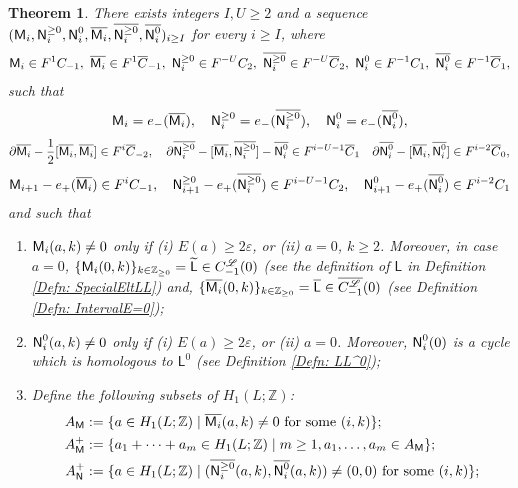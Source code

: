 \documentclass[10pt]{amsart}
\numberwithin{equation}{section}
\theoremstyle{plain}
\newtheorem{theorem}{Theorem}[section]
\theoremstyle{definition}
\theoremstyle{remark}
\numberwithin{equation}{section}
\newcommand{\Z}{\mathbb{Z}}
\newcommand{\wt}[1]{\widetilde{#1}}
\newcommand{\ol}[1]{\overline{#1}}
\newcommand{\Cfr}[1]{C_{#1}^\mathscr{L}}
\newcommand{\MM}{\textup{\textsf{M}}}
\newcommand{\NN}{\textup{\textsf{N}}}
\newcommand{\LL}{\textsf{L}}
\begin{document}
{\begin{theorem}\label{Thm: ApproxSoln}
	There exists integers $I,U\geq 2$ and a sequence $(\MM_i,\NN^{\geq 0}_i,\NN^0_i, \ol{\MM_i},\ol{\NN^{\geq 0}_i},\ol{\NN^0_i})_{i\geq I}$ for every $i\geq I$, where 
	\begin{align*}
		\MM_i \in F^1C_{-1},\,\, \ol{\MM_i}\in F^1 \ol{C}_{-1},\,\, \NN^{\geq 0}_i\in F^{-U} C_2,\,\, \ol{\NN^{\geq 0}_i} \in F^{-U}\ol{C}_2,\,\, \NN^0_i \in F^{-1} C_1,\,\, \ol{\NN^0_i}\in F^{-1}\ol{C}_1,
	\end{align*}
	such that 
	\begin{align*}
		\MM_i = e_-(\ol{\MM_i}),\quad \NN^{\geq 0}_i=e_-(\ol{\NN^{\geq 0}_i}),\quad \NN^0_i =e_-(\ol{\NN^0_i}),
	\end{align*}
	\begin{align*}
		\partial \ol{\MM_i}- \frac{1}{2}[\ol{\MM_i},\ol{\MM_i}] \in F^i\ol{C}_{-2},\quad \partial \ol{\NN^{\geq 0}_i} - [\ol{\MM_i},\ol{\NN^{\geq 0}_i}] -\ol{\NN^0_i}\in F^{i-U-1}\ol{C}_1 \quad \partial \ol{\NN^0_i} - [\ol{\MM_i},\ol{\NN^0_i}] \in F^{i-2} \ol{C}_0,
	\end{align*}
	\begin{align*}
		\MM_{i+1}-e_+(\ol{\MM_i}) \in F^iC_{-1},\quad \NN^{\geq 0}_{i+1} - e_+(\ol{\NN^{\geq 0}_i}) \in F^{i-U-1}C_2,\quad \NN^0_{i+1} - e_+(\ol{\NN^0_i}) \in F^{i-2}C_1
	\end{align*}
	and such that
	\begin{enumerate}
		\item $\MM_i(a,k)\neq 0$ only if  \emph{(i)} $E(a)\geq 2\varepsilon$, or \emph{(ii)} $a = 0$, $k\geq 2$. Moreover, in case $a = 0$, $\{ \MM_i(0,k)\}_{k\in\Z_{\geq 0}}=\wt{\LL}\in\Cfr{-1}(0)$ (see the definition of $\LL$ in Definition \ref{Defn: SpecialEltLL}) 
			and, $\{\ol{\MM_i}(0,k)\}_{k\in \Z_{\geq 0}} = \ol{\LL}\in \ol{\Cfr{-1}}(0)$   (see Definition \ref{Defn: IntervalE=0});
		\item $\NN^0_i(a,k)\neq 0$ only if \emph{(i)} $E(a)\geq 2\varepsilon$, or \emph{(ii)} $a=0$. Moreover, $\NN^0_i(0)$ is a cycle which is homologous to $\LL^0$ (see Definition \ref{Defn: LL^0});
		\item Define the following subsets of $H_1(L;\Z)$:\begin{align*}
			A_\MM&:= \{a\in H_1(L;\Z)\mid \ol{\MM_i}(a,k)\neq 0 \textup{ for some }(i,k)\};\\
			A_\MM^+&:= \{a_1+\dots + a_m\in H_1(L;\Z) \mid m\geq 1 , a_1,\dots, a_m \in A_\MM\};\\
			A_{\NN}^+&:= \{ a\in H_1(L;\Z) \mid (\ol{\NN^{\geq 0}_i}(a,k),\ol{\NN^0_i}(a,k))\neq (0,0) \textup{ for some } (i,k)\};\\

\end{align*}
\end{enumerate}
\end{theorem}}
\end{document}
